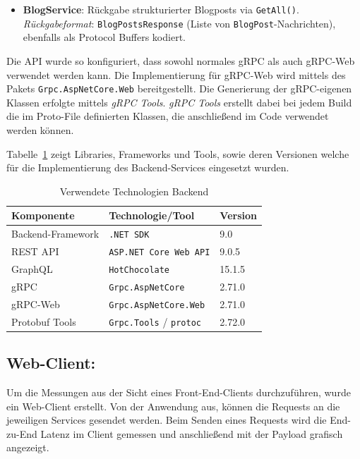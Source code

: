 \begin{enumerate}
\begin{itemize}
		\item \textbf{BlogService}: Rückgabe strukturierter Blogposts via \texttt{GetAll()}.\\
		\emph{Rückgabeformat}: \texttt{BlogPostsResponse} (Liste von \texttt{BlogPost}-Nachrichten), ebenfalls als Protocol Buffers kodiert.
	\end{itemize}
	
	Die API wurde so konfiguriert, dass sowohl normales gRPC als auch gRPC-Web verwendet werden kann. Die Implementierung für gRPC-Web wird mittels des Pakets \texttt{Grpc.AspNetCore.Web} bereitgestellt. Die Generierung der gRPC-eigenen Klassen erfolgte mittels \emph{gRPC Tools}. \emph{gRPC Tools} erstellt dabei bei jedem Build die im Proto-File definierten Klassen, die anschließend im Code verwendet werden können.
	
	 Tabelle~\ref{tab:technologienBackend} zeigt Libraries, Frameworks und Tools, sowie deren Versionen welche für die Implementierung des Backend-Services eingesetzt wurden.
	
	\begin{table}[h]
		\centering
		\caption{Verwendete Technologien Backend}
		\label{tab:technologienBackend}
		\begin{tabular}{lll}
			\hline
			\textbf{Komponente} & \textbf{Technologie/Tool} & \textbf{Version} \\
			\hline
			Backend-Framework & \texttt{.NET~SDK} & 9.0 \\
			REST API & \texttt{ASP.NET~Core~Web~API} & 9.0.5 \\
			GraphQL & \texttt{HotChocolate} & 15.1.5 \\
			gRPC & \texttt{Grpc.AspNetCore} & 2.71.0 \\
			gRPC-Web & \texttt{Grpc.AspNetCore.Web} & 2.71.0 \\
			Protobuf Tools & \texttt{Grpc.Tools} / \texttt{protoc} & 2.72.0 \\
			\hline
		\end{tabular}
	\end{table}
	
	\subsection{Web-Client:}
	Um die Messungen aus der Sicht eines Front-End-Clients durchzuführen, wurde ein Web-Client erstellt. Von der Anwendung aus, können die  Requests an die jeweiligen Services gesendet werden. Beim Senden eines Requests wird die End-zu-End Latenz im Client gemessen und anschließend mit der Payload grafisch angezeigt.  
	

\end{enumerate}
